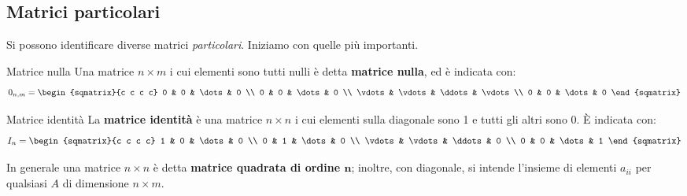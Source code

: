 \subsection{Matrici particolari}
Si possono identificare diverse matrici \textit{particolari}. Iniziamo con quelle più importanti.
\begin{newdef}{Matrice nulla}
    Una matrice $n \times m$ i cui elementi sono tutti nulli è detta \textbf{matrice nulla}, ed è indicata con:
    \[
        0_{n,m} =
        \begin{sqmatrix}{c c c c}
            0 & 0 & \dots & 0 \\
            0 & 0 & \dots & 0 \\
            \vdots & \vdots & \ddots & \vdots \\
            0 & 0 & \dots & 0
        \end{sqmatrix}
    \]
\end{newdef}
\begin{newdef}{Matrice identità}
    La \textbf{matrice identità} è una matrice $n \times n$ i cui elementi sulla diagonale sono 1 e tutti gli altri sono 0. È indicata con:
    \[
        I_n =
        \begin{sqmatrix}{c c c c}
            1 & 0 & \dots & 0 \\
            0 & 1 & \dots & 0 \\
            \vdots & \vdots & \ddots & 0 \\
            0 & 0 & \dots & 1
        \end{sqmatrix}
    \]
\end{newdef}
In generale una matrice $n \times n$ è detta \textbf{matrice quadrata di ordine $\bm{n}$}; inoltre, con diagonale, si intende l'insieme di elementi $a_{ii}$ per qualsiasi $A$ di dimensione $n \times m$.

